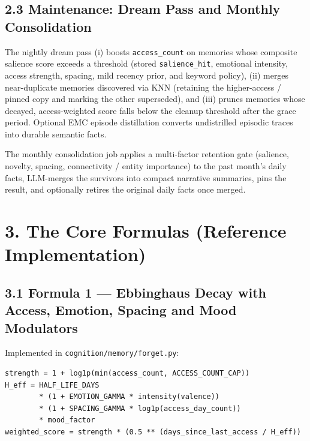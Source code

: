\documentclass[]{article}
\begin{document}
\hypertarget{maintenance-dream-pass-and-monthly-consolidation}{%
\subsection{\texorpdfstring{\textbf{2.3 Maintenance: Dream Pass and
Monthly
Consolidation}}{2.3 Maintenance: Dream Pass and Monthly Consolidation}}\label{maintenance-dream-pass-and-monthly-consolidation}}

The nightly dream pass (i) boosts \texttt{access\_count} on memories whose
composite salience score exceeds a threshold (stored \texttt{salience\_hit},
emotional intensity, access strength, spacing, mild recency prior, and
keyword policy), (ii) merges near-duplicate memories discovered via KNN
(retaining the higher-access / pinned copy and marking the other
superseded), and (iii) prunes memories whose decayed, access-weighted
score falls below the cleanup threshold after the grace period. Optional
EMC episode distillation converts undistrilled episodic traces into
durable semantic facts.

The monthly consolidation job applies a multi-factor retention gate
(salience, novelty, spacing, connectivity / entity importance) to the past
month's daily facts, LLM-merges the survivors into compact narrative
summaries, pins the result, and optionally retires the original daily
facts once merged.

\hypertarget{the-core-formulas-reference-implementation}{%
\section{\texorpdfstring{\textbf{3. The Core Formulas (Reference
Implementation)}}{3. The Core Formulas (Reference Implementation)}}\label{the-core-formulas-reference-implementation}}

\hypertarget{formula-1-ebbinghaus-decay-with-modulators}{%
\subsection{\texorpdfstring{\textbf{3.1 Formula 1 --- Ebbinghaus Decay
with Access, Emotion, Spacing and Mood
Modulators}}{3.1 Formula 1 --- Ebbinghaus Decay with Access, Emotion, Spacing and Mood Modulators}}\label{formula-1-ebbinghaus-decay-with-modulators}}

Implemented in \texttt{cognition/memory/forget.py}:

\begin{verbatim}
strength = 1 + log1p(min(access_count, ACCESS_COUNT_CAP))
H_eff = HALF_LIFE_DAYS
        * (1 + EMOTION_GAMMA * intensity(valence))
        * (1 + SPACING_GAMMA * log1p(access_day_count))
        * mood_factor
weighted_score = strength * (0.5 ** (days_since_last_access / H_eff))
\end{verbatim}
\end{document}

